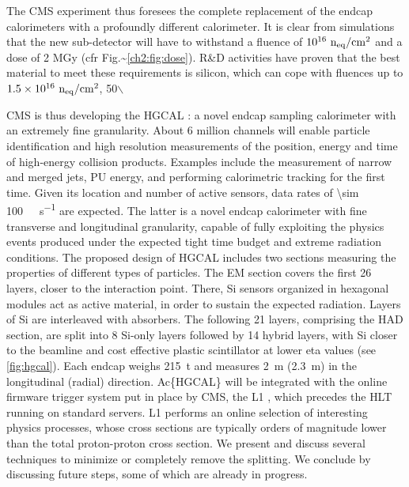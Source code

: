\documentclass[11pt]{article}
\begin{document}
The CMS experiment thus foresees the complete replacement of the endcap calorimeters with a profoundly different calorimeter. It is clear from simulations that the new sub-detector will have to withstand a fluence of \(10^{16}~\rm n_{eq}/cm^2\) and a dose of 2 MGy (cfr Fig.\textasciitilde{}\cref{ch2:fig:dose}). R\&D activities have proven that the best material to meet these requirements is silicon, which can cope with fluences up to \(1.5\times10^{16}~\rm n_{eq}/cm^2\), 50$\backslash$%

\Ac{CMS} \cite{cms_collab} is thus developing the \ac{HGCAL} \cite{hgcalTDR}: a novel endcap sampling calorimeter with an extremely fine granularity.
About \num{6} million channels will enable particle identification and high resolution measurements of the position, energy and time of high-energy collision products.
Examples include the measurement of narrow and merged jets, \ac{PU} energy, and performing calorimetric tracking for the first time.
Given its location and number of active sensors, data rates of \SI{\sim 100}{\tera\byte\per\second} are expected.
The latter is a novel endcap calorimeter with fine transverse and longitudinal granularity, capable of fully exploiting the physics events produced under the expected tight time budget and extreme radiation conditions.
The proposed design of \ac{HGCAL} includes two sections measuring the properties of different types of particles.
The \ac{EM} section covers the first 26 layers, closer to the interaction point.
There, \ac{Si} sensors organized in hexagonal modules act as active material, in order to sustain the expected radiation.
Layers of \ac{Si} are interleaved with absorbers.
The following 21 layers, comprising the \ac{HAD} section, are split into 8 \ac{Si}-only layers followed by 14 hybrid layers, with \ac{Si} closer to the beamline and cost effective plastic scintillator at lower \ac{eta} values (see \cref{fig:hgcal}). 
Each endcap weighs \SI{215}{\tonne} and measures \SI{2}{\meter} (\SI{2.3}{\meter}) in the longitudinal (radial) direction.
Ac\{HGCAL\} will be integrated with the online firmware trigger system put in place by \ac{CMS}, the \ac{L1} \cite{l1TDR}, which precedes the \ac{HLT} running on standard servers.
\Ac{L1} performs an online selection of interesting physics processes, whose cross sections are typically orders of magnitude lower than the total proton-proton cross section.
We present and discuss several techniques to minimize or completely remove the splitting.
We conclude by discussing future steps, some of which are already in progress.
\end{document}
